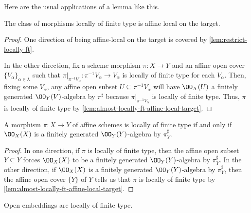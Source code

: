 \documentclass[../notes.tex]{subfiles}
\begin{document}
Here are the usual applications of a lemma like this.
\begin{corollary} \label{cor:locally-ft-affine-local-target}
	The class of morphisms locally of finite type is affine local on the target.
\end{corollary}
\begin{proof}
	One direction of being affine-local on the target is covered by \autoref{lem:restrict-locally-ft}.

	In the other direction, fix a scheme morphism $\pi\colon X\to Y$ and an affine open cover $\{V_\alpha\}_{\alpha\in\lambda}$ such that $\pi|_{\pi^{-1}V_\alpha}\colon\pi^{-1}V_\alpha\to V_\alpha$ is locally of finite type for each $V_\alpha$. Then, fixing some $V_\alpha$, any affine open subset $U\subseteq\pi^{-1}V_\alpha$ will have $\OO_X(U)$ a finitely generated $\OO_Y(V)$-algebra by $\pi^\sharp$ because $\pi|_{\pi^{-1}V_\alpha}$ is locally of finite type. Thus, $\pi$ is locally of finite type by \autoref{lem:almost-locally-ft-affine-local-target}.
\end{proof}
\begin{corollary} \label{cor:affine-locally-ft}
	A morphism $\pi\colon X\to Y$ of affine schemes is locally of finite type if and only if $\OO_X(X)$ is a finitely generated $\OO_Y(Y)$-algebra by $\pi^\sharp_Y$.
\end{corollary}
\begin{proof}
	In one direction, if $\pi$ is locally of finite type, then the affine open subset $Y\subseteq Y$ forces $\OO_X(X)$ to be a finitely generated $\OO_Y(Y)$-algebra by $\pi^\sharp_Y$. In the other direction, if $\OO_X(X)$ is a finitely generated $\OO_Y(Y)$-algebra by $\pi^\sharp_Y$, then the affine open cover $\{Y\}$ of $Y$ tells us that $\pi$ is locally of finite type by \autoref{lem:almost-locally-ft-affine-local-target}.
\end{proof}
\begin{corollary}
	Open embeddings are locally of finite type.
\end{corollary}
\end{document}
